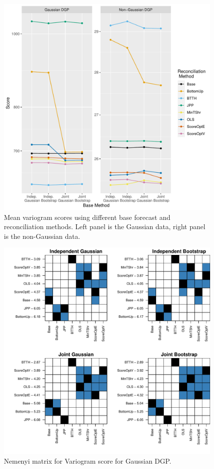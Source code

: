 \documentclass[a4paper,12pt]{article}
\theoremstyle{definition}
\begin{document}
\begin{figure}[!htb]
	\centering
	\includegraphics[width=0.45\textheight]{Figs/variogram_meanscore}
	\caption{Mean variogram scores using different base forecast and reconciliation methods. Left panel is the Gaussian data, right panel is the non-Gaussian data.}
	\label{fig:meanscore_v}
\end{figure}

\begin{figure}[!htb]
	\centering
	\includegraphics[height=.4\textheight]{Figs/gsv.pdf}
	\caption{Nemenyi matrix for Variogram score for Gaussian DGP.}
	\label{fig:gsv}
\end{figure}
\end{document}
